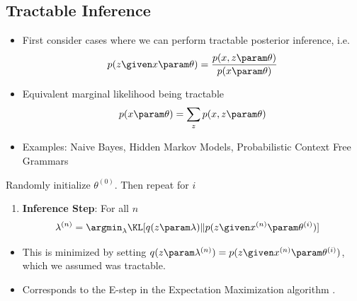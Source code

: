\subsection{Tractable Inference}
\begin{frame}
\begin{center}
\end{center}
\begin{itemize}
    \item First consider cases where we can perform tractable posterior inference, i.e.
    \[ p(z \given x \param \theta) = \frac{p(x, z \param \theta)}{p(x \param \theta)}\]
    \item Equivalent marginal likelihood being tractable
    \[  p(x \param \theta) = \sum_{z} p(x, z \param \theta) \]
    \item Examples: Naive Bayes, Hidden Markov Models, Probabilistic Context Free Grammars
\end{itemize}
\end{frame}

\begin{frame}
\begin{center}
\end{center}
Randomly initialize $\theta^{(0)}$. Then repeat for $i$
\begin{enumerate}
    \item \textbf{Inference Step}: For all $n$
    \begin{align*}
        \lambda^{(n)} &= \argmin_{\lambda} \KL[q(z \param \lambda) \Vert p(z \given x^{(n)} \param \theta^{(i)})]
    \end{align*} 
\end{enumerate}
\begin{itemize}
    \item This is minimized by setting $q(z \param \lambda^{(n)}) = p(z \given x^{(n)} \param \theta^{(i)})$, which we assumed was tractable. 
    \item Corresponds to the E-step in the Expectation Maximization algorithm \citep{dempster77em}.
\end{itemize}

\end{frame}

